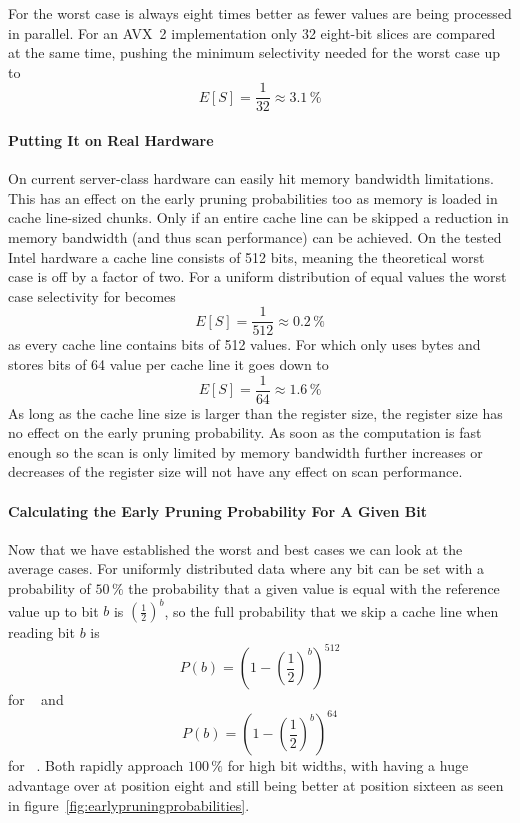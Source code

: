 For \bs{} the worst case is always eight times better as fewer values are being
processed in parallel. For an AVX~2 implementation only 32 eight-bit slices are
compared at the same time, pushing the minimum selectivity needed for the worst
case up to $$E[S]=\frac{1}{32}\approx 3.1\,\%$$

\paragraph{Putting It on Real Hardware}

On current server-class hardware \bwv{} can easily hit memory bandwidth
limitations. This has an effect on the early pruning probabilities too as
memory is loaded in cache line-sized chunks. Only if an entire cache line can
be skipped a reduction in memory bandwidth (and thus scan performance) can be
achieved. On the tested Intel hardware a cache line consists of 512 bits,
meaning the theoretical worst case is off by a factor of two. For a uniform
distribution of equal values the worst case selectivity for \bwv{} becomes
$$E[S]=\frac{1}{512}\approx 0.2\,\%$$ as every cache line contains bits of 512
values. For \bs{} which only uses bytes and stores bits of 64 value per cache
line it goes down to $$E[S]=\frac{1}{64}\approx 1.6\,\%$$ As long as the cache
line size is larger than the register size, the register size has no effect on
the early pruning probability. As soon as the computation is fast enough so the
scan is only limited by memory bandwidth further increases or decreases of the
register size will not have any effect on scan performance.

\paragraph{Calculating the Early Pruning Probability For A Given Bit}

Now that we have established the worst and best cases we can look at the
average cases. For uniformly distributed data where any bit can be set with a
probability of $50\,\%$ the probability that a given value is equal with the
reference value up to bit $b$ is ${\left(\frac{1}{2}\right)}^b$,
so the full probability that we skip a cache line when reading bit $b$ is
$$P(b)={\left(1-{\left(\frac{1}{2}\right)}^b\right)}^{512}$$
for \bwv{}~\cite{BitWeaving} and
$$P(b)={\left(1-{\left(\frac{1}{2}\right)}^b\right)}^{64}$$
for \bs{}~\cite{ByteSlice}. Both rapidly approach $100\,\%$ for high bit widths,
with \bs{} having a huge advantage over \bwv{} at position eight and still being
better at position sixteen as seen in
figure~\ref{fig:earlypruningprobabilities}.

